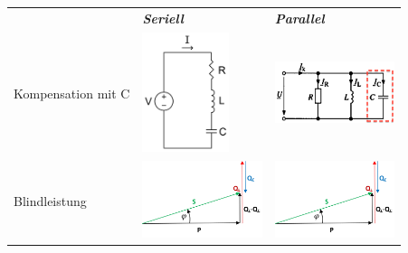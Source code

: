\renewcommand{\arraystretch}{1.5}
\begin{tabular}{p{7cm}|p{4.5cm}|p{5cm}}
	\hline
	&
	\begin{minipage}{4cm}
		\textbf{\textit{Seriell}} 
	\end{minipage} & 
	\begin{minipage}{4.5cm}
		\textbf{\textit{Parallel}} 
	\end{minipage} \\
	Kompensation mit C &
    	\begin{minipage}{4cm}
    		\includegraphics[height=3.5cm]{bilder/RLC-Seriell.png} \newline
        \end{minipage} & 
		\begin{minipage}{4.5cm}
			\includegraphics[width=3.5cm]{bilder/Parallelkompensation.png} \newline
		\end{minipage} \\
	Blindleistung &
		\begin{minipage}{4.5cm}
			\includegraphics[width=3.5cm]{bilder/Blindleistungskompensation_RostBau.jpg} \newline
        \end{minipage} &
		\begin{minipage}{4.5cm}
        	\includegraphics[width=3.5cm]{bilder/Blindleistungskompensation_RostBau.jpg} \newline

\end{minipage}
\end{tabular}
